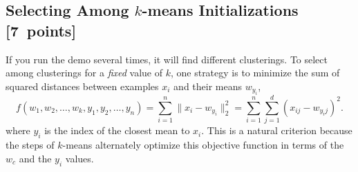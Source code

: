 \documentclass{article}
\newcommand\pts[1]{\textcolor{pointscolour}{[#1~points]}}
\newcommand{\norm}[1]{\lVert #1 \rVert}
\begin{document}
    \clearpage
    \subsection{Selecting Among $k$-means Initializations \pts{7}}

    If you run the demo several times, it will find different clusterings. To select among clusterings for a \emph{fixed} value of $k$, one strategy is to minimize the sum of squared distances between examples $x_i$ and their means $w_{y_i}$,
    \[
    f(w_1,w_2,\dots,w_k,y_1,y_2,\dots,y_n) = \sum_{i=1}^n \norm{x_i - w_{y_i}}_2^2 = \sum_{i=1}^n \sum_{j=1}^d (x_{ij} - w_{y_ij})^2.
    \]
    where $y_i$ is the index of the closest mean to $x_i$. This is a natural criterion because the steps of $k$-means alternately optimize this objective function in terms of the $w_c$ and the $y_i$ values.
\end{document}
